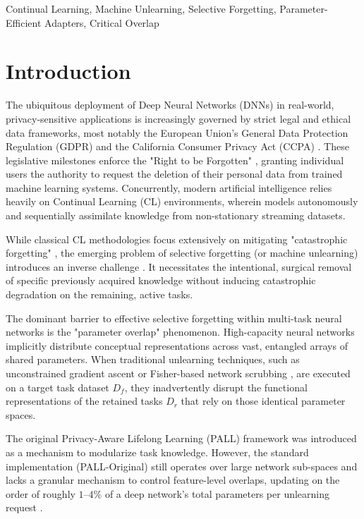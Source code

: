 \documentclass[conference]{IEEEtran}
\theoremstyle{plain}
\theoremstyle{definition}
\theoremstyle{remark}
\begin{document}
\begin{IEEEkeywords}
Continual Learning, Machine Unlearning, Selective Forgetting, Parameter-Efficient Adapters, Critical Overlap
\end{IEEEkeywords}

\section{Introduction}

The ubiquitous deployment of Deep Neural Networks (DNNs) in real-world, privacy-sensitive applications is increasingly governed by strict legal and ethical data frameworks, most notably the European Union's General Data Protection Regulation (GDPR) \cite{gdpr2016} and the California Consumer Privacy Act (CCPA) \cite{ccpa2018}. These legislative milestones enforce the "Right to be Forgotten" \cite{gdpr2016}, granting individual users the authority to request the deletion of their personal data from trained machine learning systems. Concurrently, modern artificial intelligence relies heavily on Continual Learning (CL) environments, wherein models autonomously and sequentially assimilate knowledge from non-stationary streaming datasets.

While classical CL methodologies focus extensively on mitigating "catastrophic forgetting" \cite{mccloskey1989catastrophic, kirkpatrick2017overcoming}, the emerging problem of selective forgetting (or machine unlearning) introduces an inverse challenge \cite{cao2015towards, bourtoule2021machine}. It necessitates the intentional, surgical removal of specific previously acquired knowledge without inducing catastrophic degradation on the remaining, active tasks.

The dominant barrier to effective selective forgetting within multi-task neural networks is the "parameter overlap" phenomenon. High-capacity neural networks implicitly distribute conceptual representations across vast, entangled arrays of shared parameters. When traditional unlearning techniques, such as unconstrained gradient ascent or Fisher-based network scrubbing \cite{golatkar2020forgetting}, are executed on a target task dataset \(D_f\), they inadvertently disrupt the functional representations of the retained tasks \(D_r\) that rely on those identical parameter spaces.

The original Privacy-Aware Lifelong Learning (PALL) framework \cite{ozdenizci2025pall} was introduced as a mechanism to modularize task knowledge. However, the standard implementation (PALL-Original) still operates over large network sub-spaces and lacks a granular mechanism to control feature-level overlaps, updating on the order of roughly $1$--$4\%$ of a deep network's total parameters per unlearning request \cite{ozdenizci2025pall}.
\end{document}
